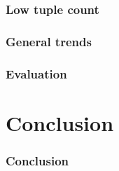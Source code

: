 \documentclass{beamer}
\begin{document}
\begin{frame}
\frametitle{Low tuple count}

\end{frame}

\begin{frame}
\frametitle{General trends}

\end{frame}

\begin{frame}
\frametitle{Evaluation}
{\footnotesize}
\end{frame}

\section{Conclusion}
\begin{frame}
\frametitle{Conclusion}
\end{frame}
\end{document}
